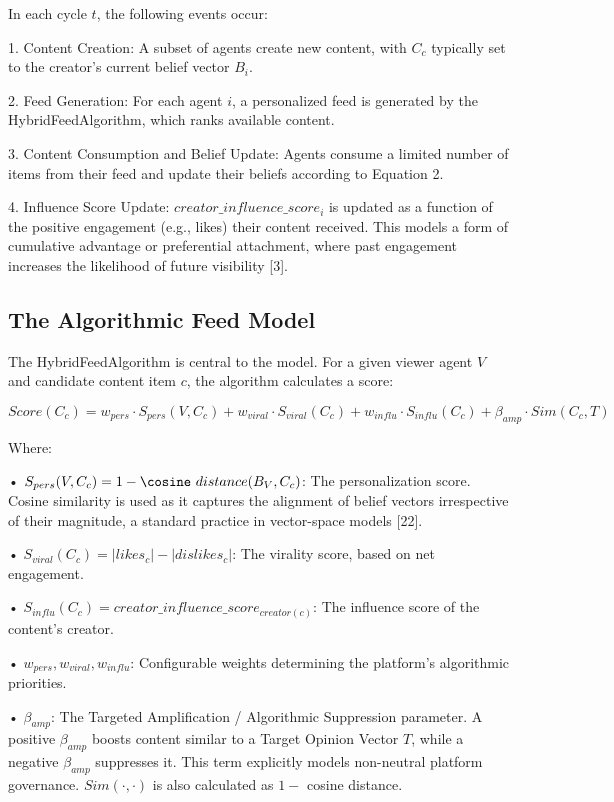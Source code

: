 \documentclass[11pt]{article}
\begin{document}
In each cycle $t$, the following events occur:

1. Content Creation: A subset of agents create new content, with $C_c$ typically set to the creator’s current belief vector $B_i$.

2. Feed Generation: For each agent $i$, a personalized feed is generated by the HybridFeedAlgorithm, which ranks available content.

3. Content Consumption and Belief Update: Agents consume a limited number of items from their feed and update their beliefs according to Equation 2.

4. Influence Score Update: $creator\_influence\_score_i$ is updated as a function of the positive engagement (e.g., likes) their content received. This models a form of cumulative advantage or preferential attachment, where past engagement increases the likelihood of future visibility [3].

\subsection{The Algorithmic Feed Model}

The HybridFeedAlgorithm is central to the model. For a given viewer agent $V$ and candidate content item $c$, the algorithm calculates a score:

\begin{equation}
Score(C_c) = w_{pers} \cdot S_{pers}(V, C_c) + w_{viral} \cdot S_{viral}(C_c) + w_{influ} \cdot S_{influ}(C_c) + \beta_{amp} \cdot Sim(C_c, T)
\end{equation}

Where:

• $S_{pers}(V, C_c) = 1 - \cosine\ distance(B_V , C_c)$: The personalization score. Cosine similarity is used as it captures the alignment of belief vectors irrespective of their magnitude, a standard practice in vector-space models [22].

• $S_{viral}(C_c) = |likes_c| - |dislikes_c|$: The virality score, based on net engagement.

• $S_{influ}(C_c) = creator\_influence\_score_{creator(c)}$: The influence score of the content’s creator.

• $w_{pers}, w_{viral}, w_{influ}$: Configurable weights determining the platform’s algorithmic priorities.

• $\beta_{amp}$: The Targeted Amplification / Algorithmic Suppression parameter. A positive $\beta_{amp}$ boosts content similar to a Target Opinion Vector $T$, while a negative $\beta_{amp}$ suppresses it. This term explicitly models non-neutral platform governance. $Sim(\cdot, \cdot)$ is also calculated as $1 -$ cosine distance.
\end{document}
